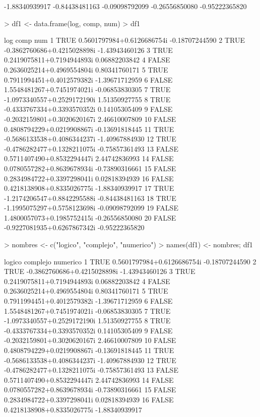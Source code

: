 \documentclass{article}
\begin{document}
\begin{Schunk}
\begin{Soutput}
[16] -1.88340939917 -0.84438481163 -0.09098792099 -0.26556850080 -0.95222365820
\end{Soutput}
\begin{Sinput}
> df1 <- data.frame(log, comp, num)
> df1
\end{Sinput}
\begin{Soutput}
     log                        comp            num
1   TRUE  0.5601797984+0.6126686754i -0.18707244590
2   TRUE -0.3862760686+0.4215028898i -1.43943460126
3   TRUE  0.2419075811+0.7194944893i  0.06882203842
4  FALSE  0.2636025214+0.4969554804i  0.80341760171
5   TRUE  0.7911994451+0.4012579382i -1.39671712959
6  FALSE  1.5548481267+0.7451974021i -0.06853830305
7   TRUE -1.0973340557+0.2529172190i  1.51350927755
8   TRUE -0.4333767334+0.3393570352i  0.14105305409
9  FALSE -0.2032159801+0.3020620167i  2.46610007809
10 FALSE  0.4808794229+0.0219908867i -0.13691818445
11  TRUE -0.5686133538+0.4086344237i -1.40967884930
12  TRUE -0.4786282477+0.1328211075i -0.75857361493
13 FALSE  0.5711407490+0.8532294447i  2.44742836993
14 FALSE  0.0780557282+0.8639678934i -0.73890316661
15 FALSE  0.2834984722+0.3397298041i  0.02818394939
16 FALSE  0.4218138908+0.8335026775i -1.88340939917
17  TRUE -1.2174206547+0.8842295588i -0.84438481163
18  TRUE -1.1995075297+0.5758123698i -0.09098792099
19 FALSE  1.4800057073+0.1985752415i -0.26556850080
20 FALSE -0.9227081935+0.6267867342i -0.95222365820
\end{Soutput}
\begin{Sinput}
> nombres <- c("logico", "complejo", "numerico")
> names(df1) <- nombres; df1
\end{Sinput}
\begin{Soutput}
   logico                    complejo       numerico
1    TRUE  0.5601797984+0.6126686754i -0.18707244590
2    TRUE -0.3862760686+0.4215028898i -1.43943460126
3    TRUE  0.2419075811+0.7194944893i  0.06882203842
4   FALSE  0.2636025214+0.4969554804i  0.80341760171
5    TRUE  0.7911994451+0.4012579382i -1.39671712959
6   FALSE  1.5548481267+0.7451974021i -0.06853830305
7    TRUE -1.0973340557+0.2529172190i  1.51350927755
8    TRUE -0.4333767334+0.3393570352i  0.14105305409
9   FALSE -0.2032159801+0.3020620167i  2.46610007809
10  FALSE  0.4808794229+0.0219908867i -0.13691818445
11   TRUE -0.5686133538+0.4086344237i -1.40967884930
12   TRUE -0.4786282477+0.1328211075i -0.75857361493
13  FALSE  0.5711407490+0.8532294447i  2.44742836993
14  FALSE  0.0780557282+0.8639678934i -0.73890316661
15  FALSE  0.2834984722+0.3397298041i  0.02818394939
16  FALSE  0.4218138908+0.8335026775i -1.88340939917

\end{Soutput}
\end{Schunk}
\end{document}
